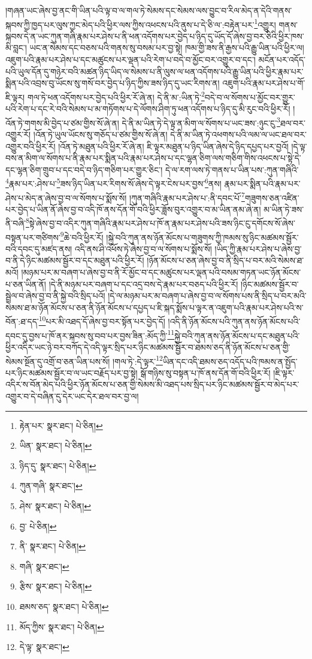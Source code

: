 །གཞན་ཡང་ཞེས་བྱ་ནང་གི་ཡིན་པའི་ལྟ་བ་ལ་གལ་ཏེ་སེམས་དང་སེམས་ལས་བྱུང་བ་རིལ་མེད་ན་དེའི་གནས་སྐབས་ཀྱི་ཁྱད་པར་ལུས་ཀྱང་མེད་པའི་ཕྱིར་ལས་ཀྱིས་འཕངས་པའི་ནུས་པ་དེ་ཅི་ལ་:བརྟེན་པར་\footnote{རྟེན་པར་  སྣར་ཐང་།  པེ་ཅིན། }འགྱུར། གནས་སྐབས་དེ་ན་ཡང་ཀུན་གཞི་རྣམ་པར་ཤེས་པ་ནི་ཕན་འདོགས་པར་བྱེད་པ་ཉིད་དུ་ཡོད་དོ་ཞེས་བྱ་བར་ཅིའི་ཕྱིར་ཁས་མི་བླང་། ཡང་ན་སེམས་དང་བཅས་པའི་གནས་སུ་བསམ་པར་བྱ་སྟེ། ཁམ་གྱི་ཟས་ནི་རྒྱས་པའི་རྒྱུ་ཡིན་པའི་ཕྱིར་ལ། འཇུག་པའི་རྣམ་པར་ཤེས་པ་དང་མཚུངས་པར་ལྡན་པའི་རེག་པ་བདེ་བ་མྱོང་བར་འགྱུར་བ་དང་། མངོན་པར་འདོད་པའི་ཡུལ་དོན་དུ་གཉེར་བའི་མཚན་ཉིད་ཡིད་ལ་སེམས་པ་ནི་ལུས་ལ་ཕན་འདོགས་པའི་རྒྱུ་ཡིན་པའི་ཕྱིར་རྣམ་པར་སྨིན་པའི་འབྲས་བུ་ཡོངས་སུ་གསོ་བར་བྱེད་པ་ཉིད་ཀྱིས་ཟས་ཉིད་དུ་ཡང་རིགས་ན། འཇུག་པའི་རྣམ་པར་ཤེས་པ་གོ་ཇི་ལྟར། གལ་ཏེ་ཕན་འདོགས་པར་བྱེད་པའི་ཕྱིར་རོ་ཞེ་ན། དེ་ནི་མ་:ཡིན་ཏེ་\footnote{ཡིན་  སྣར་ཐང་།  པེ་ཅིན། }བདེ་བ་ལ་སོགས་པ་མྱོང་བར་གྱུར་པའི་རེག་པ་དང་རེ་བའི་སེམས་པ་མ་གཏོགས་པ་དེ་ལོགས་ཤིག་ཏུ་ཕན་འདོགས་པ་ཉིད་དུ་མི་རུང་བའི་ཕྱིར་རོ། །འོན་ཏེ་གགས་མི་བྱེད་པ་ཙམ་གྱིས་སོ་ཞེ་ན། དེ་ནི་མ་ཡིན་ཏེ་དེ་ལྟ་ན་མིག་ལ་སོགས་པ་ཡང་ཟས་:ཉུང་ངུ་\footnote{ཉིད་དུ་  སྣར་ཐང་།  པེ་ཅིན། }ཐལ་བར་འགྱུར་རོ། །འོན་ཏེ་ཡུལ་ཡོངས་སུ་གཅོད་པ་ཙམ་གྱིས་སོ་ཞེ་ན། དེ་ནི་མ་ཡིན་ཏེ་འཕགས་པའི་ལམ་ལ་ཡང་ཐལ་བར་འགྱུར་བའི་ཕྱིར་རོ། །འོན་ཏེ་མཐུན་པའི་ཕྱིར་རོ་ཞེ་ན། ཇི་ལྟར་མཐུན་པ་ཉིད་ཡིན་ཞེས་དེ་ཉིད་དཔྱད་པར་བྱའོ། །དེ་ལྟ་བས་ན་མིག་ལ་སོགས་པ་ནི་རྣམ་པར་སྨིན་པའི་རྣམ་པར་ཤེས་པ་དང་ལྷན་ཅིག་ལས་གཅིག་གིས་འཕངས་པ་སྟེ་དེ་དང་ལྷན་ཅིག་གྲུབ་པ་དང་བདེ་བ་ཉིད་གཅིག་པར་གྱུར་ཅིང་། དེ་ལ་རག་ལས་ཏེ་གནས་པ་ཡིན་པས་:ཀུན་གཞིའི་\footnote{ཀུན་གཞི་  སྣར་ཐང་། }རྣམ་པར་:ཤེས་པ་\footnote{ཤེས་  སྣར་ཐང་།  པེ་ཅིན། }ཟས་ཉིད་ཡིན་པར་རིགས་སོ་ཞེས་དེ་ལྟར་ངེས་པར་བྱས་\footnote{བྱ་  པེ་ཅིན། }ནས། རྣམ་པར་སྨིན་པའི་རྣམ་པར་ཤེས་པ་མེད་ན་ཞེས་བྱ་བ་ལ་སོགས་པ་སྨོས་སོ། །ཀུན་གཞིའི་རྣམ་པར་ཤེས་པ་:ནི་དབང་པོ་\footnote{ནི་  སྣར་ཐང་།  པེ་ཅིན། }གཟུགས་ཅན་འཛིན་པར་བྱེད་པ་ཡིན་ནོ་ཞེས་བྱ་བ་འདི་ཁོ་ནས་དོན་གོ་བའི་ཕྱིར་ཟློས་བུར་འགྱུར་བ་མ་ཡིན་ནམ་ཞེ་ན། མ་ཡིན་ཏེ་ཟས་ནི་བཞི་\footnote{གཞི་  སྣར་ཐང་། }སྟེ་ཞེས་བྱ་བ་འདིར་ཀུན་གཞིའི་རྣམ་པར་ཤེས་པ་ཁོ་ན་རྣམ་པར་ཤེས་པའི་ཟས་ཉིང་ངུ་དགོངས་སོ་ཞེས་བསྟན་པར་གཙིགས་\footnote{རྩིས་  སྣར་ཐང་།  པེ་ཅིན། }ཆེ་བའི་ཕྱིར་རོ། །སྐྱེ་བའི་ཀུན་ནས་ཉོན་མོངས་པ་གཟུགས་ཀྱི་ཁམས་སུ་ཉིང་མཚམས་སྦྱོར་བའི་དབང་དུ་མཛད་ནས། འདི་ནས་ཤི་འཕོས་ཏེ་ཞེས་བྱ་བ་ལ་སོགས་པ་སྨོས་སོ། །ཡིད་ཀྱི་རྣམ་པར་ཤེས་པ་ཞེས་བྱ་བ་ནི་དེ་ཉིང་མཚམས་སྦྱོར་བ་དང་མཐུན་པའི་ཕྱིར་རོ། །ཉོན་མོངས་པ་ཅན་ཞེས་བྱ་བ་ནི་སྲིད་པ་བར་མའི་སེམས་ཐ་མའོ། །མཉམ་པར་མ་བཞག་པ་ཞེས་བྱ་བ་ནི་རོ་མྱོང་བ་དང་མཚུངས་པར་ལྡན་པའི་བསམ་གཏན་ཡང་ཉོན་མོངས་པ་ཅན་ཡིན་ནོ། །དེ་ནི་མཉམ་པར་བཞག་པ་དང་འདྲ་བས་དེ་རྣམ་པར་བཅད་པའི་ཕྱིར་རོ། །ཉིང་མཚམས་སྦྱོར་བ་སྦྲེལ་བ་ཞེས་བྱ་བ་ནི་སྐྱེ་བའི་སྲིད་པའོ། །དེ་ལ་མཉམ་པར་མ་བཞག་པ་ཞེས་བྱ་བ་ལ་སོགས་པས་ནི་སྲིད་པ་བར་མའི་སེམས་ཐ་མ་ཉོན་མོངས་པ་ཅན་ནི་ཉོན་མོངས་པ་དཔྱད་པ་ཇི་སྐད་སྨོས་པ་ལྟར་ན་འཇུག་པའི་རྣམ་པར་ཤེས་པའི་ས་བོན་:ཐ་དད་\footnote{ཐམས་ཅད་  སྣར་ཐང་།  པེ་ཅིན། }པར་མི་འཐད་དོ་ཞེས་བྱ་བར་སྟོན་པར་བྱེད་དོ། །འདི་ནི་ཉོན་མོངས་པའི་ཀུན་ནས་ཉོན་མོངས་པའི་དབང་དུ་བྱས་པ་ཁོ་ནར་སྐབས་སུ་བབ་པར་བྱས་ཟིན་:མོད་ཀྱི་\footnote{མོད་ཀྱིས་  སྣར་ཐང་།  པེ་ཅིན། }སྐྱེ་བའི་ཀུན་ནས་ཉོན་མོངས་པ་དང་མཐུན་པའི་ཕྱིར་འདིར་ཡང་ཉེ་བར་བཀོད་དེ་འདི་ལྟར་སྲིད་པར་ཉིང་མཚམས་སྦྱོར་བ་ཐམས་ཅད་ནི་ཉོན་མོངས་པ་ཅན་གྱི་སེམས་སྔོན་དུ་འགྲོ་བ་ཅན་ཡིན་པས་སོ། །གལ་ཏེ་:དེ་ལྟར་\footnote{དེ་ལྟ་  སྣར་ཐང་། }ཡིན་དང་འདི་ཐམས་ཅད་འདོད་པའི་ཁམས་ན་སྤྱོད་པར་ཉིང་མཚམས་སྦྱོར་བ་ལ་ཡང་བརྗོད་པར་བྱ་སྟེ། སྒོ་གཉིས་སུ་བསྟན་པ་ཁོ་ནས་དོན་གོ་བའི་ཕྱིར་རོ། །ཇི་ལྟར་འདིར་ས་བོན་མེད་པའི་ཕྱིར་ཉོན་མོངས་པ་ཅན་གྱི་སེམས་མི་འཐད་པས་སྲིད་པར་ཉིང་མཚམས་སྦྱོར་བ་མེད་པར་འགྱུར་བ་དེ་བཞིན་དུ་དེར་ཡང་དེར་ཐལ་བར་བྱ་ལ། 